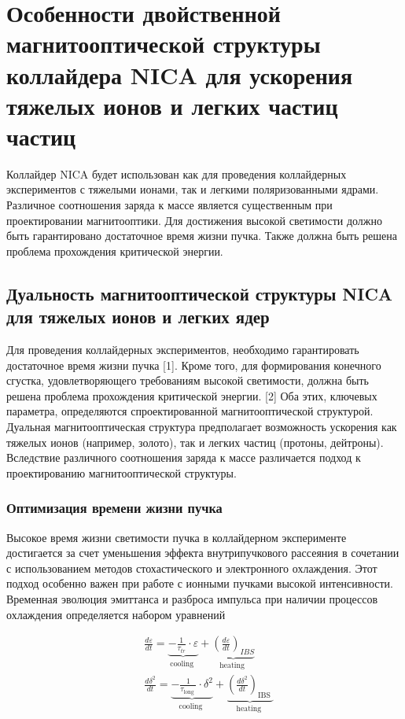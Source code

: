 
	\chapter{Особенности двойственной магнитооптической структуры коллайдера NICA для ускорения тяжелых ионов и легких частиц частиц}\label{ch:ions_light}

	Коллайдер NICA будет использован как для проведения коллайдерных экспериментов с тяжелыми ионами, так и легкими поляризованными ядрами. Различное соотношения заряда к массе является существенным при проектировании магнитооптики. Для достижения высокой светимости должно быть гарантировано достаточное время жизни пучка. Также должна быть решена проблема прохождения критической энергии.	

	\section{Дуальность магнитооптической структуры NICA для тяжелых ионов и легких ядер}\label{sec:ch:ions_light/duality}
	
	Для проведения коллайдерных экспериментов, необходимо гарантировать достаточное время жизни пучка [1]. Кроме того, для формирования конечного сгустка, удовлетворяющего требованиям высокой светимости, должна быть решена проблема прохождения критической энергии. [2] Оба этих, ключевых параметра, определяются спроектированной магнитооптической структурой.
Дуальная магнитооптическая структура предполагает возможность ускорения как тяжелых ионов (например, золото), так и легких частиц (протоны, дейтроны). Вследствие различного соотношения заряда к массе различается подход к проектированию магнитооптической структуры.


	\subsection{Оптимизация времени жизни пучка}
\par Высокое время жизни светимости пучка в коллайдерном эксперименте достигается за счет уменьшения эффекта внутрипучкового рассеяния в сочетании с использованием методов стохастического и электронного охлаждения. Этот подход особенно важен при работе с ионными пучками высокой интенсивности. Временная эволюция эмиттанса и разброса импульса при наличии процессов охлаждения определяется набором уравнений

\begin{equation}
\begin{aligned}
& \frac{d \varepsilon}{d t}=\underbrace{-\frac{1}{\tau_{t r}} \cdot \varepsilon}_{\text {cooling }}+\underbrace{\left(\frac{d \varepsilon}{d t}\right)_{I B S}}_{\text {heating }} \\
& \frac{d \delta^2}{d t}=\underbrace{-\frac{1}{\tau_{\text {long }}} \cdot \delta^2}_{\text {cooling }}+\underbrace{\left(\frac{d \delta^2}{d t}\right)_{\text {IBS }}}_{\text {heating }} \\
&
\end{aligned}
\end{equation}

